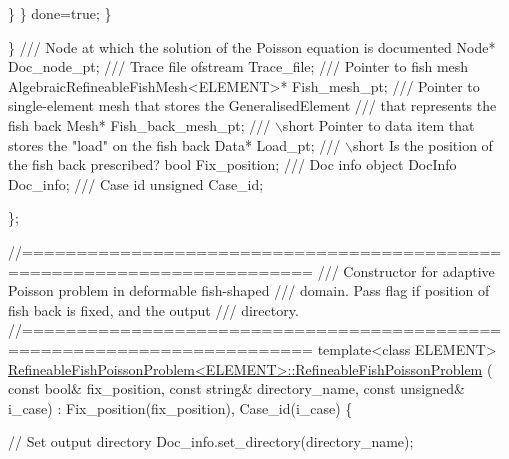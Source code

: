 \begin{DoxyCodeInclude}
        \}
      \}
     done=\textcolor{keyword}{true};
    \}
   
  \}
 \textcolor{comment}{}
\textcolor{comment}{ /// Node at which the solution of the Poisson equation is documented}
\textcolor{comment}{} Node* Doc\_node\_pt;
\textcolor{comment}{}
\textcolor{comment}{ /// Trace file}
\textcolor{comment}{} ofstream Trace\_file;
\textcolor{comment}{}
\textcolor{comment}{ /// Pointer to fish mesh}
\textcolor{comment}{} AlgebraicRefineableFishMesh<ELEMENT>* Fish\_mesh\_pt;
\textcolor{comment}{}
\textcolor{comment}{ /// Pointer to single-element mesh that stores the GeneralisedElement}
\textcolor{comment}{ /// that represents the fish back}
\textcolor{comment}{} Mesh* Fish\_back\_mesh\_pt;
\textcolor{comment}{}
\textcolor{comment}{ /// \(\backslash\)short Pointer to data item that stores the "load" on the fish back}
\textcolor{comment}{} Data* Load\_pt;
\textcolor{comment}{}
\textcolor{comment}{ /// \(\backslash\)short Is the position of the fish back prescribed?}
\textcolor{comment}{} \textcolor{keywordtype}{bool} Fix\_position;
\textcolor{comment}{}
\textcolor{comment}{ /// Doc info object}
\textcolor{comment}{} DocInfo Doc\_info;
\textcolor{comment}{}
\textcolor{comment}{ /// Case id}
\textcolor{comment}{} \textcolor{keywordtype}{unsigned} Case\_id;

\};





\textcolor{comment}{//========================================================================}\textcolor{comment}{}
\textcolor{comment}{/// Constructor for adaptive Poisson problem in deformable fish-shaped}
\textcolor{comment}{/// domain. Pass flag if position of fish back is fixed, and the output}
\textcolor{comment}{/// directory. }
\textcolor{comment}{}\textcolor{comment}{//========================================================================}
\textcolor{keyword}{template}<\textcolor{keyword}{class} ELEMENT>
\hyperlink{classRefineableFishPoissonProblem_a2585d906fab348e09bfb9b4c111ac161}{RefineableFishPoissonProblem<ELEMENT>::RefineableFishPoissonProblem}
      (
 \textcolor{keyword}{const} \textcolor{keywordtype}{bool}& fix\_position, \textcolor{keyword}{const} \textcolor{keywordtype}{string}& directory\_name,
 \textcolor{keyword}{const} \textcolor{keywordtype}{unsigned}& i\_case) : Fix\_position(fix\_position), Case\_id(i\_case)
\{ 


 \textcolor{comment}{// Set output directory}
 Doc\_info.set\_directory(directory\_name); 
 

\end{DoxyCodeInclude}
